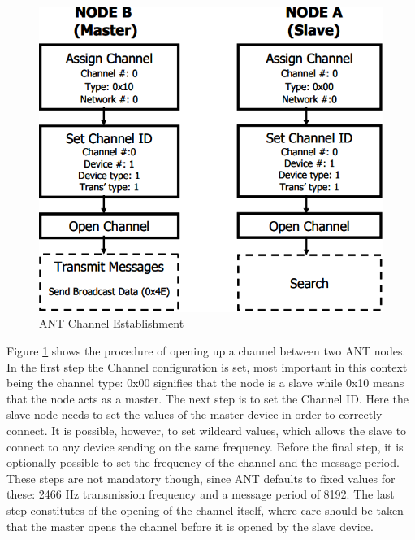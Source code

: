 \begin{figure}[H]
	\centering
	\includegraphics[scale=0.7]{./pics/ANTsetup.png}
	\caption{ANT Channel Establishment\cite{DynastreamInnovationsInc.2013}}\label{fig:antsetup}
\end{figure}

Figure \ref{fig:antsetup} shows the procedure of opening up a channel between two ANT nodes. In the first step the Channel configuration is set, most important in this context being the channel type: 0x00 signifies that the node is a slave while 0x10 means that the node acts as a master. The next step is to set the Channel ID. Here the slave node needs to set the values of the master device in order to correctly connect. It is possible, however, to set wildcard values, which allows the slave to connect to any device sending on the same frequency. Before the final step, it is optionally possible to set the frequency of the channel and the message period. These steps are not mandatory though, since ANT defaults to fixed values for these: 2466 Hz transmission frequency and a message period of 8192. The last step constitutes of the opening of the channel itself, where care should be taken that the master opens the channel before it is opened by the slave device.

